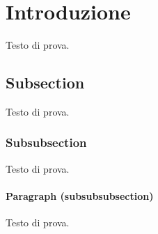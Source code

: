 \section{Introduzione}

Testo di prova.

\subsection{Subsection}

Testo di prova.

\subsubsection{Subsubsection}

Testo di prova.

\paragraph{Paragraph (subsubsubsection)}

Testo di prova.
